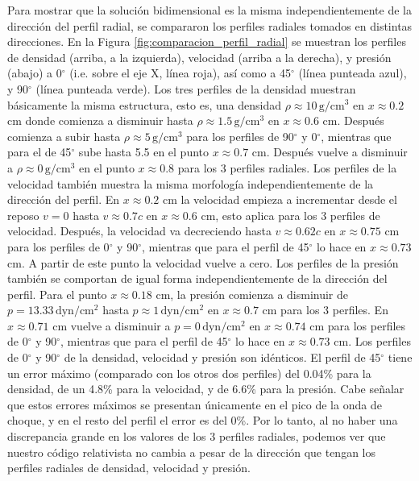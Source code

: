 \documentclass[12pt,a4paper]{book}
\begin{document}


Para mostrar que la solución bidimensional es la misma independientemente de la dirección del perfil radial, se compararon los perfiles radiales tomados en distintas direcciones. En la Figura 
\ref{fig:comparacion_perfil_radial} se muestran los perfiles de densidad (arriba, a la izquierda), velocidad (arriba a la derecha), y presión (abajo) a 0$^{\circ}$ (i.e. sobre el eje X, línea roja), así como a 
45$^{\circ}$ (línea punteada azul), y 90$^{\circ}$ (línea punteada verde). Los tres perfiles de la densidad muestran básicamente la misma estructura, esto es, una densidad $\rho \approx 10 \, \text{g}/\text{cm}^3$ 
en $x \approx 0.2$ cm donde comienza a disminuir hasta $\rho \approx 1.5 \, \text{g}/\text{cm}^3$ en $x \approx 0.6$ cm. Después comienza a subir hasta $\rho \approx 5 \, \text{g}/\text{cm}^3$ para los perfiles de 90$^{\circ}$ 
y 0$^{\circ}$, mientras que para el de 45$^{\circ}$ sube hasta 5.5 en el punto $x \approx 0.7$ cm. Después vuelve a disminuir a $\rho \approx 0 \, \text{g}/\text{cm}^3$ en el punto $x \approx 0.8$ para los 3 perfiles 
radiales.
Los perfiles de la velocidad también muestra la misma morfología independientemente de la dirección del perfil. En $x \approx 0.2$ cm la velocidad empieza a incrementar desde el reposo $v = 0$ hasta $v \approx 0.7c$ 
en $x \approx 0.6$ cm, esto aplica para los 3 perfiles de velocidad. Después, la velocidad va decreciendo hasta $v \approx 0.62c$ en $x \approx 0.75$ cm para los perfiles de 0$^{\circ}$ y 90$^{\circ}$, mientras que 
para el perfil de 45$^{\circ}$ lo hace en $x \approx 0.73$ cm. A partir de este punto la velocidad vuelve a cero.
Los perfiles de la presión también se comportan de igual forma independientemente de la dirección del perfil. Para el punto $x \approx 0.18$ cm, la presión comienza a disminuir de $p = 13.33 \,  \text{dyn}/ \text{cm}^2$ 
hasta $p \approx 1 \,  \text{dyn}/ \text{cm}^2$ en $x \approx 0.7$ cm para los 3 perfiles. En $x \approx 0.71 $ cm vuelve a disminuir a $p = 0 \,  \text{dyn}/ \text{cm}^2$ en $x \approx 0.74 $ cm para los perfiles de 
0$^{\circ}$ y 90$^{\circ}$, mientras que para el perfil de 45$^{\circ}$ lo hace en $x \approx 0.73 $ cm.
Los perfiles de 0$^{\circ}$ y 90$^{\circ}$ de la densidad, velocidad y presión son idénticos. El perfil de 45$^{\circ}$ tiene un error máximo (comparado con los otros dos perfiles) del 0.04\% para la densidad, 
de un 4.8\% para la velocidad, y de 6.6\% para la presión. Cabe señalar que estos errores máximos se presentan únicamente en el pico de la onda de choque, y en el resto del perfil el error es del 0\%. Por lo tanto, 
al no haber una discrepancia grande en los valores de los 3 perfiles radiales, podemos ver que nuestro código relativista no cambia a pesar de la dirección que tengan los perfiles radiales de  densidad, velocidad y presión.
\end{document}
